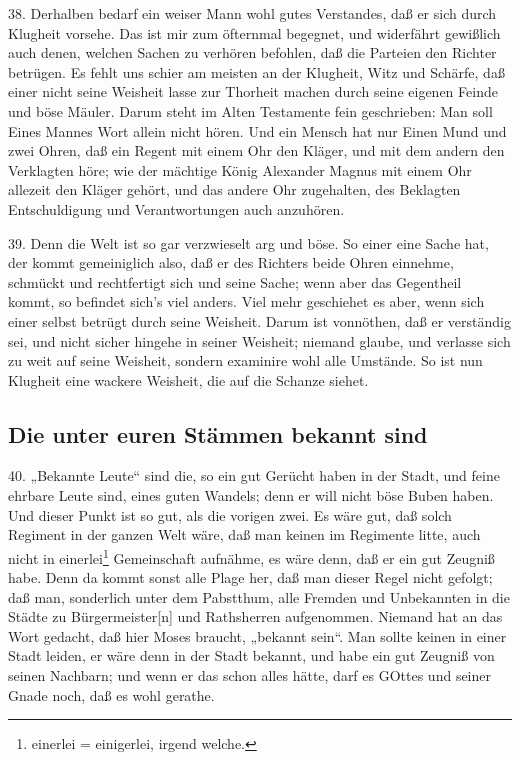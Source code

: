 38. Derhalben bedarf ein weiser Mann wohl gutes Verstandes, daß er sich durch Klugheit vorsehe. Das ist mir zum öfternmal begegnet, und widerfährt gewißlich auch denen, welchen Sachen zu verhören befohlen, daß die Parteien den Richter betrügen. Es fehlt uns schier am meisten an der Klugheit, Witz und Schärfe, daß einer nicht seine Weisheit lasse zur Thorheit machen durch seine eigenen Feinde und böse Mäuler. Darum steht im Alten Testamente fein geschrieben: Man soll Eines Mannes Wort allein nicht hören. Und ein Mensch hat nur Einen Mund und zwei Ohren, daß ein Regent mit einem Ohr den Kläger, und mit dem andern den Verklagten höre; wie der mächtige König Alexander Magnus mit einem Ohr allezeit den Kläger gehört, und das andere Ohr zugehalten, des Beklagten Entschuldigung und Verantwortungen auch anzuhören.

39. Denn die Welt ist so gar verzwieselt arg und böse. So einer eine Sache hat, der kommt gemeiniglich also, daß er des Richters beide Ohren einnehme, schmückt und rechtfertigt sich und seine Sache; wenn aber das Gegentheil kommt, so befindet sich’s viel anders. Viel mehr geschiehet es aber, wenn sich einer selbst betrügt durch seine Weisheit. Darum ist vonnöthen, daß er verständig sei, und nicht sicher hingehe in seiner Weisheit; niemand glaube, und verlasse sich zu weit auf seine Weisheit, sondern examinire wohl alle Umstände. So ist nun Klugheit eine wackere Weisheit, die auf die Schanze siehet.

\subsection{Die unter euren Stämmen bekannt sind}

40. „Bekannte Leute“ sind die, so ein gut Gerücht haben in der Stadt, und feine ehrbare Leute sind, eines guten Wandels; denn er will nicht böse Buben haben. Und dieser Punkt ist so gut, als die vorigen zwei. Es wäre gut, daß solch Regiment in der ganzen Welt wäre, daß man keinen im Regimente litte, auch nicht in einerlei\footnote{einerlei = einigerlei, irgend welche.} Gemeinschaft aufnähme, es wäre denn, daß er ein gut Zeugniß habe. Denn da kommt sonst alle Plage her, daß man dieser Regel nicht gefolgt; daß man, sonderlich unter dem Pabstthum, alle Fremden und Unbekannten in die Städte zu Bürgermeister[n] und Rathsherren aufgenommen. Niemand hat an das Wort gedacht, daß hier Moses braucht, „bekannt sein“. Man sollte keinen in einer Stadt leiden, er wäre denn in der Stadt bekannt, und habe ein gut Zeugniß von seinen Nachbarn; und wenn er das schon alles hätte, darf es GOttes und seiner Gnade noch, daß es wohl gerathe.

